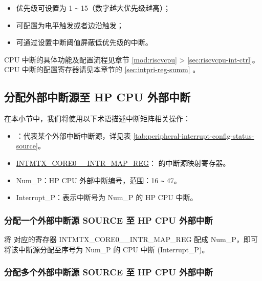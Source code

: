 \documentclass[main\_\_CN.tex]{subfiles}
\begin{document}
\begin{itemize}
    \item 优先级可设置为 1 \verb+~+ 15（数字越大优先级越高）；
    \item 可配置为电平触发或者边沿触发；
    \item 可通过设置中断阈值屏蔽低优先级的中断。
\end{itemize}

\begin{tiplisting}
CPU 中断的具体功能及配置流程见章节 \ref{mod:riscvcpu} \textit{} >  \ref{sec:riscvcpu-int-ctrl}\textit{}。CPU 中断的配置寄存器请见本章节的 \ref{sec:intpri-reg-summ} \textit{}。
\end{tiplisting}
\vspace{-1em}


\subsection{分配外部中断源至 HP CPU 外部中断}

在本小节中，我们将使用以下术语描述中断矩阵相关操作：

\begin{itemize}

\item {}：代表某个外部中断中断源，详见表 \ref{tab:peripheral-interrupt-config-status-source}。

\item \hyperref[INTMTXCORE0SOURCEINTRMAPREG]{INTMTX\_CORE0\_\_INTR\_MAP\_REG}： 的中断源映射寄存器。
\item Num\_P：HP CPU 外部中断编号，范围：16 \verb+~+ 47。

\item Interrupt\_P：表示中断号为 Num\_P 的 HP CPU 中断。
\end{itemize}

\subsubsection{分配一个外部中断源 SOURCE 至 HP CPU 外部中断}

将  对应的寄存器 INTMTX\_CORE0\_\_INTR\_MAP\_REG 配成 Num\_P，即可将该中断源分配至序号为 Num\_P 的 CPU 中断 (Interrupt\_P)。

\subsubsection{分配多个外部中断源 SOURCE 至 HP CPU 外部中断}
\end{document}
